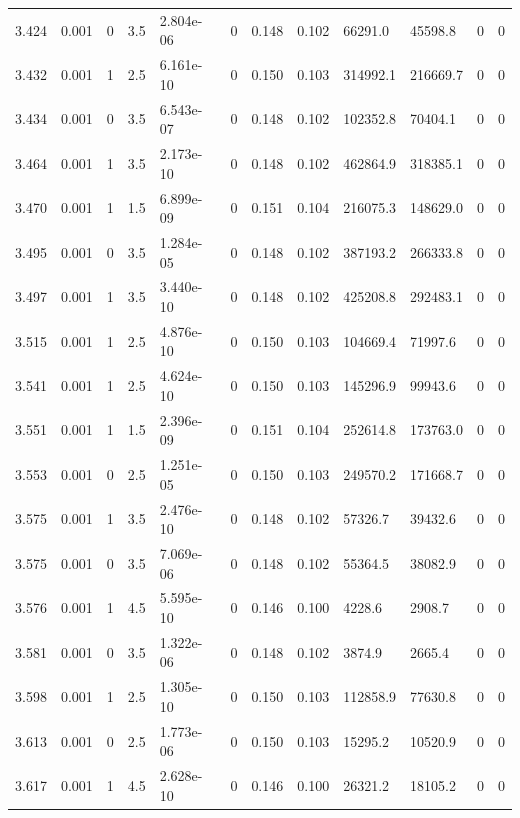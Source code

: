 \documentclass[preview]{standalone}
\begin{document}
{{{{{{{{\begin{tabular}{L{1.2cm}C{1.2cm} C{0.3cm}C{0.5cm} C{1.4cm}C{1.4cm} C{1.4cm}C{1.4cm} C{1.6cm}C{1.6cm} C{1.6cm}C{1.6cm}}
  3.424  &  0.001  & 0     & 3.5 &  2.804e-06  & 0  &  0.148&   0.102& 66291.0 & 45598.8   &  0 & 0  \\ 
  3.432  &  0.001  & 1     & 2.5 &  6.161e-10  & 0  &  0.150&   0.103& 314992.1 & 216669.7   &  0 & 0  \\ 
  3.434  &  0.001  & 0     & 3.5 &  6.543e-07  & 0  &  0.148&   0.102& 102352.8 & 70404.1   &  0 & 0  \\ 
  3.464  &  0.001  & 1     & 3.5 &  2.173e-10  & 0  &  0.148&   0.102& 462864.9 & 318385.1   &  0 & 0  \\ 
  3.470  &  0.001  & 1     & 1.5 &  6.899e-09  & 0  &  0.151&   0.104& 216075.3 & 148629.0   &  0 & 0  \\ 
  3.495  &  0.001  & 0     & 3.5 &  1.284e-05  & 0  &  0.148&   0.102& 387193.2 & 266333.8   &  0 & 0  \\ 
  3.497  &  0.001  & 1     & 3.5 &  3.440e-10  & 0  &  0.148&   0.102& 425208.8 & 292483.1   &  0 & 0  \\ 
  3.515  &  0.001  & 1     & 2.5 &  4.876e-10  & 0  &  0.150&   0.103& 104669.4 & 71997.6   &  0 & 0  \\ 
  3.541  &  0.001  & 1     & 2.5 &  4.624e-10  & 0  &  0.150&   0.103& 145296.9 & 99943.6   &  0 & 0  \\ 
  3.551  &  0.001  & 1     & 1.5 &  2.396e-09  & 0  &  0.151&   0.104& 252614.8 & 173763.0   &  0 & 0  \\ 
  3.553  &  0.001  & 0     & 2.5 &  1.251e-05  & 0  &  0.150&   0.103& 249570.2 & 171668.7   &  0 & 0  \\ 
  3.575  &  0.001  & 1     & 3.5 &  2.476e-10  & 0  &  0.148&   0.102& 57326.7 & 39432.6   &  0 & 0  \\ 
  3.575  &  0.001  & 0     & 3.5 &  7.069e-06  & 0  &  0.148&   0.102& 55364.5 & 38082.9   &  0 & 0  \\ 
  3.576  &  0.001  & 1     & 4.5 &  5.595e-10  & 0  &  0.146&   0.100& 4228.6 & 2908.7   &  0 & 0  \\ 
  3.581  &  0.001  & 0     & 3.5 &  1.322e-06  & 0  &  0.148&   0.102& 3874.9 & 2665.4   &  0 & 0  \\ 
  3.598  &  0.001  & 1     & 2.5 &  1.305e-10  & 0  &  0.150&   0.103& 112858.9 & 77630.8   &  0 & 0  \\ 
  3.613  &  0.001  & 0     & 2.5 &  1.773e-06  & 0  &  0.150&   0.103& 15295.2 & 10520.9   &  0 & 0  \\ 
  3.617  &  0.001  & 1     & 4.5 &  2.628e-10  & 0  &  0.146&   0.100& 26321.2 & 18105.2   &  0 & 0  \\ 

\end{tabular}}}}}}}}}
\end{document}
